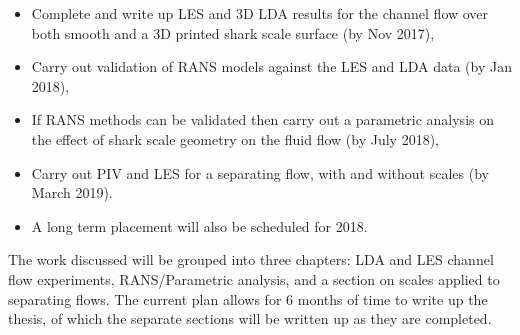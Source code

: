 \documentclass[12pt,oneside,a4paper]{article}
\begin{document}
\begin{itemize}
\itemsep0em
\item	Complete and write up LES and 3D LDA results for the channel flow over both smooth and a 3D printed shark scale surface (by Nov 2017),

\item 	Carry out validation of RANS models against the LES and LDA data (by Jan 2018),

\item	 If RANS methods can be validated then carry out a parametric analysis on the effect of shark scale geometry on the fluid flow (by July 2018),

\item	Carry out PIV and LES for a separating flow, with and without scales (by March 2019).

\item	A long term placement will also be scheduled for 2018.

\end{itemize}
\noindent
The work discussed will be grouped into three chapters: LDA and LES channel flow experiments, RANS/Parametric analysis, and a section on scales applied to separating flows. The current plan allows for 6 months of time to write up the thesis, of which the separate sections will be written up as they are completed. 


\newpage

\end{document}
